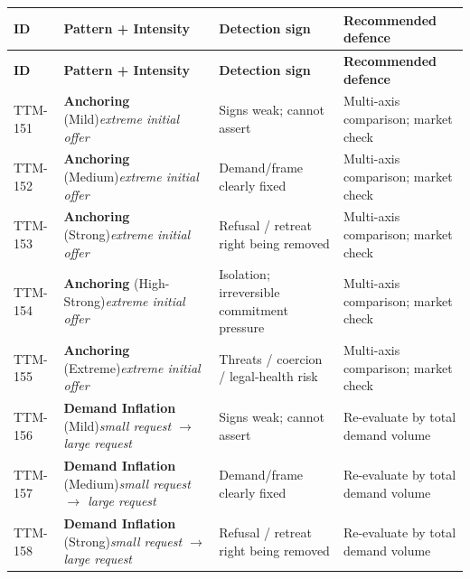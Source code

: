 \begin{small}
\begin{longtable}{@{}p{1.4cm}p{3.6cm}p{3.6cm}p{4.0cm}@{}}
\toprule
\textbf{ID} & \textbf{Pattern + Intensity} & \textbf{Detection sign} & \textbf{Recommended defence} \\
\midrule
\endfirsthead
\toprule
\textbf{ID} & \textbf{Pattern + Intensity} & \textbf{Detection sign} & \textbf{Recommended defence} \\
\midrule
\endhead
\bottomrule
\endfoot
TTM-151 & \textbf{Anchoring} (Mild)\newline\textit{\footnotesize extreme initial offer} & Signs weak; cannot assert & Multi-axis comparison; market check \\
\addlinespace[0.2em]
TTM-152 & \textbf{Anchoring} (Medium)\newline\textit{\footnotesize extreme initial offer} & Demand/frame clearly fixed & Multi-axis comparison; market check \\
\addlinespace[0.2em]
TTM-153 & \textbf{Anchoring} (Strong)\newline\textit{\footnotesize extreme initial offer} & Refusal / retreat right being removed & Multi-axis comparison; market check \\
\addlinespace[0.2em]
TTM-154 & \textbf{Anchoring} (High-Strong)\newline\textit{\footnotesize extreme initial offer} & Isolation; irreversible commitment pressure & Multi-axis comparison; market check \\
\addlinespace[0.2em]
TTM-155 & \textbf{Anchoring} (Extreme)\newline\textit{\footnotesize extreme initial offer} & Threats / coercion / legal-health risk & Multi-axis comparison; market check \\
\addlinespace[0.2em]
TTM-156 & \textbf{Demand Inflation} (Mild)\newline\textit{\footnotesize small request $\to$ large request} & Signs weak; cannot assert & Re-evaluate by total demand volume \\
\addlinespace[0.2em]
TTM-157 & \textbf{Demand Inflation} (Medium)\newline\textit{\footnotesize small request $\to$ large request} & Demand/frame clearly fixed & Re-evaluate by total demand volume \\
\addlinespace[0.2em]
TTM-158 & \textbf{Demand Inflation} (Strong)\newline\textit{\footnotesize small request $\to$ large request} & Refusal / retreat right being removed & Re-evaluate by total demand volume \\

\end{longtable}
\end{small}
